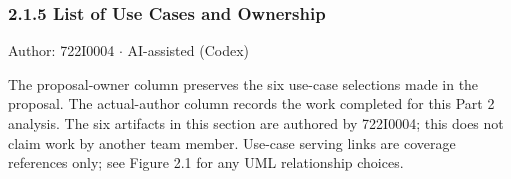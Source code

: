 \subsubsection*{2.1.5 List of Use Cases and Ownership}
Author: 722I0004 \ensuremath{\cdot} AI-assisted (Codex)

The proposal-owner column preserves the six use-case selections made in the proposal. The actual-author column records the work completed for this Part 2 analysis. The six artifacts in this section are authored by 722I0004; this does not claim work by another team member. Use-case serving links are coverage references only; see Figure 2.1 for any UML relationship choices.

